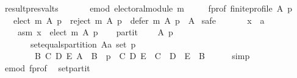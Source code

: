 \begin{isabellebody}
\ result{\isacharunderscore}{\kern0pt}presv{\isacharunderscore}{\kern0pt}alts{\isacharcolon}{\kern0pt}\isanewline
\ \ \isanewline
\ \ \ \ e{\isacharunderscore}{\kern0pt}mod{\isacharcolon}{\kern0pt}\ {\isachardoublequoteopen}electoral{\isacharunderscore}{\kern0pt}module\ m{\isachardoublequoteclose}\ \isanewline
\ \ \ \ f{\isacharunderscore}{\kern0pt}prof{\isacharcolon}{\kern0pt}\ {\isachardoublequoteopen}finite{\isacharunderscore}{\kern0pt}profile\ A\ p{\isachardoublequoteclose}\isanewline
\ \ \ {\isachardoublequoteopen}{\isacharparenleft}{\kern0pt}elect\ m\ A\ p{\isacharparenright}{\kern0pt}\ {\isasymunion}\ {\isacharparenleft}{\kern0pt}reject\ m\ A\ p{\isacharparenright}{\kern0pt}\ {\isasymunion}\ {\isacharparenleft}{\kern0pt}defer\ m\ A\ p{\isacharparenright}{\kern0pt}\ {\isacharequal}{\kern0pt}\ A{\isachardoublequoteclose}\isanewline
%
\isadelimproof
%
\endisadelimproof
%
\isatagproof
{}\isamarkupfalse%
\ {\isacharparenleft}{\kern0pt}safe{\isacharparenright}{\kern0pt}\isanewline
\ \ \isamarkupfalse%
\isanewline
\ \ \ \ x\ {\isacharcolon}{\kern0pt}{\isacharcolon}{\kern0pt}\ {\isachardoublequoteopen}{\isacharprime}{\kern0pt}a{\isachardoublequoteclose}\isanewline
\ \ \isamarkupfalse%
\isanewline
\ \ \ \ asm{\isacharcolon}{\kern0pt}\ {\isachardoublequoteopen}x\ {\isasymin}\ elect\ m\ A\ p{\isachardoublequoteclose}\isanewline
\ \ \isamarkupfalse%
\ partit{\isacharcolon}{\kern0pt}\isanewline
\ \ \ \ {\isachardoublequoteopen}{\isasymforall}A\ p{\isachardot}{\kern0pt}\isanewline
\ \ \ \ \ \ {\isasymnot}\ set{\isacharunderscore}{\kern0pt}equals{\isacharunderscore}{\kern0pt}partition\ {\isacharparenleft}{\kern0pt}A{\isacharcolon}{\kern0pt}{\isacharcolon}{\kern0pt}{\isacharprime}{\kern0pt}a\ set{\isacharparenright}{\kern0pt}\ p\ {\isasymor}\isanewline
\ \ \ \ \ \ \ \ {\isacharparenleft}{\kern0pt}{\isasymexists}B\ C\ D\ E{\isachardot}{\kern0pt}\ A\ {\isacharequal}{\kern0pt}\ B\ {\isasymand}\ p\ {\isacharequal}{\kern0pt}\ {\isacharparenleft}{\kern0pt}C{\isacharcomma}{\kern0pt}\ D{\isacharcomma}{\kern0pt}\ E{\isacharparenright}{\kern0pt}\ {\isasymand}\ C\ {\isasymunion}\ D\ {\isasymunion}\ E\ {\isacharequal}{\kern0pt}\ B{\isacharparenright}{\kern0pt}{\isachardoublequoteclose}\isanewline
\ \ \ \ \isamarkupfalse%
\ simp\isanewline
\ \ \isamarkupfalse%
\ e{\isacharunderscore}{\kern0pt}mod\ f{\isacharunderscore}{\kern0pt}prof\ \isamarkupfalse%
\ set{\isacharunderscore}{\kern0pt}partit{\isacharcolon}{\kern0pt}\isanewline

\end{isabellebody}
